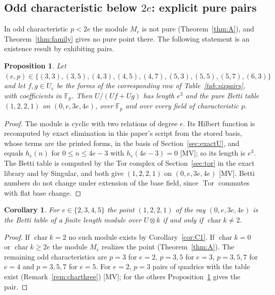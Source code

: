 \documentclass[11pt]{article}
\newtheorem{proposition}{Proposition}
\newtheorem{corollary}{Corollary}
\theoremstyle{definition}
\theoremstyle{remark}
\newcommand{\F}{\mathbb{F}}
\newcommand{\Tor}{\operatorname{Tor}}
\newcommand{\ch}{\operatorname{char}}
\begin{document}
\subsection{Odd characteristic below \texorpdfstring{$2e$}{2e}: explicit pure pairs}
\label{sec:oddchar}

In odd characteristic $p<2e$ the module $M_e$ is not pure (Theorem~\ref{thm:A}), and Theorem~\ref{thm:family} gives no pure point there. The following statement is an existence result by exhibiting pairs.

\begin{proposition}\label{prop:odd}
Let $(e,p)\in\{(3,3),(3,5),(4,3),(4,5),(4,7),(5,3),(5,5),(5,7),(6,3)\}$ and let $f,g\in U_e$ be the forms of the corresponding row of Table~\ref{tab:sixpairs}, with coefficients in $\F_p$. Then $U/(Uf+Ug)$ has length $e^3$ and the pure Betti table $(1,2,2,1)$ on $(0,e,3e,4e)$, over $\F_p$ and over every field of characteristic $p$.
\end{proposition}
\begin{proof}
The module is cyclic with two relations of degree $e$. Its Hilbert function is recomputed by exact elimination in this paper's script from the stored basis, whose terms are the printed forms, in the basis of Section~\ref{sec:exactU}, and equals $h_e(n)$ for $0\le n\le4e-3$ with $h_e(4e-3)=0$ [MV]; so its length is $e^3$. The Betti table is computed by the Tor complex of Section~\ref{sec:tor} in the exact library and by Singular, and both give $(1,2,2,1)$ on $(0,e,3e,4e)$ [MV]. Betti numbers do not change under extension of the base field, since $\Tor$ commutes with flat base change.
\end{proof}

\begin{corollary}\label{cor:ray}
For $e\in\{2,3,4,5\}$ the point $(1,2,2,1)$ of the ray $(0,e,3e,4e)$ is the Betti table of a finite length module over $U\otimes k$ if and only if $\ch k\ne2$.
\end{corollary}
\begin{proof}
If $\ch k=2$ no such module exists by Corollary~\ref{cor:C1}. If $\ch k=0$ or $\ch k\ge2e$ the module $M_e$ realizes the point (Theorem~\ref{thm:A}). The remaining odd characteristics are $p=3$ for $e=2$, $p=3,5$ for $e=3$, $p=3,5,7$ for $e=4$ and $p=3,5,7$ for $e=5$. For $e=2$, $p=3$ pairs of quadrics with the table exist (Remark~\ref{rem:charthree}) [MV]; for the others Proposition~\ref{prop:odd} gives the pair.
\end{proof}
\end{document}
